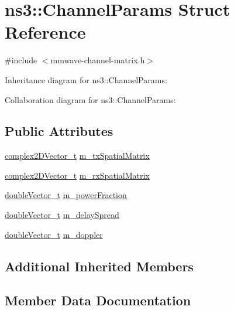 \hypertarget{structns3_1_1ChannelParams}{}\section{ns3\+:\+:Channel\+Params Struct Reference}
\label{structns3_1_1ChannelParams}


{\ttfamily \#include $<$mmwave-\/channel-\/matrix.\+h$>$}



Inheritance diagram for ns3\+:\+:Channel\+Params\+:


Collaboration diagram for ns3\+:\+:Channel\+Params\+:
\subsection*{Public Attributes}
\begin{DoxyCompactItemize}
\item 
\hyperlink{namespacens3_aa25e3feece2676fd7470d50d4ba3d1d1}{complex2\+D\+Vector\+\_\+t} \hyperlink{structns3_1_1ChannelParams_aa83a7d27a497c2ce0abcb43829715918}{m\+\_\+tx\+Spatial\+Matrix}
\item 
\hyperlink{namespacens3_aa25e3feece2676fd7470d50d4ba3d1d1}{complex2\+D\+Vector\+\_\+t} \hyperlink{structns3_1_1ChannelParams_acfc240ffbabe9b666ea668c447d64ab4}{m\+\_\+rx\+Spatial\+Matrix}
\item 
\hyperlink{namespacens3_aa6f1edf6566ca6afec613bc6e40240ea}{double\+Vector\+\_\+t} \hyperlink{structns3_1_1ChannelParams_a2ae066bb72cdcf63d55b8cf903bb950b}{m\+\_\+power\+Fraction}
\item 
\hyperlink{namespacens3_aa6f1edf6566ca6afec613bc6e40240ea}{double\+Vector\+\_\+t} \hyperlink{structns3_1_1ChannelParams_ac2304bc380b12c74537585a4c6ea7584}{m\+\_\+delay\+Spread}
\item 
\hyperlink{namespacens3_aa6f1edf6566ca6afec613bc6e40240ea}{double\+Vector\+\_\+t} \hyperlink{structns3_1_1ChannelParams_a889245513e4a3b1c5aa59ab5990265d2}{m\+\_\+doppler}
\end{DoxyCompactItemize}
\subsection*{Additional Inherited Members}


\subsection{Member Data Documentation}
